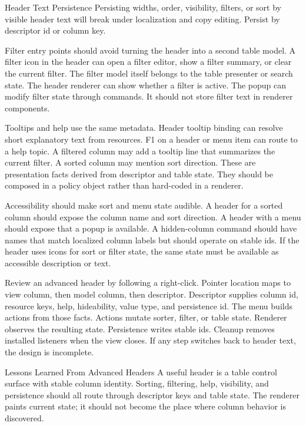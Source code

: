 \begin{pitfallbox}{Header Text Persistence}
Persisting widths, order, visibility, filters, or sort by visible header text will break
under localization and copy editing. Persist by descriptor id or column key.
\end{pitfallbox}

Filter entry points should avoid turning the header into a second table model. A filter
icon in the header can open a filter editor, show a filter summary, or clear the current
filter. The filter model itself belongs to the table presenter or search state. The
header renderer can show whether a filter is active. The popup can modify filter state
through commands. It should not store filter text in renderer components.

Tooltips and help use the same metadata. Header tooltip binding can resolve short
explanatory text from resources. F1 on a header or menu item can route to a help topic.
A filtered column may add a tooltip line that summarizes the current filter. A sorted
column may mention sort direction. These are presentation facts derived from descriptor
and table state. They should be composed in a policy object rather than hard-coded in a
renderer.

Accessibility should make sort and menu state audible. A header for a sorted column
should expose the column name and sort direction. A header with a menu should expose
that a popup is available. A hidden-column command should have names that match
localized column labels but should operate on stable ids. If the header uses icons for
sort or filter state, the same state must be available as accessible description or
text.

Review an advanced header by following a right-click. Pointer location maps to view
column, then model column, then descriptor. Descriptor supplies column id, resource
keys, help, hideability, value type, and persistence id. The menu builds actions from
those facts. Actions mutate sorter, filter, or table state. Renderer observes the
resulting state. Persistence writes stable ids. Cleanup removes installed listeners when
the view closes. If any step switches back to header text, the design is incomplete.

\begin{principlebox}{Lessons Learned From Advanced Headers}
A useful header is a table control surface with stable column identity. Sorting,
filtering, help, visibility, and persistence should all route through descriptor
keys and table state. The renderer paints current state; it should not become
the place where column behavior is discovered.
\end{principlebox}


